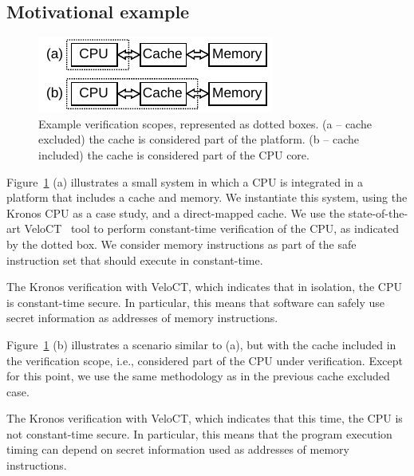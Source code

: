 \subsection{Motivational example}

\begin{figure}[t]
    \begin{center}
    \includegraphics[width=0.6\columnwidth]{figures/verifscopecache/verifscopecache.pdf}
    \end{center}
    \vspace*{-1em}
    \caption{\label{fig:verifscopecache}
        Example verification scopes, represented as dotted boxes. (a -- cache excluded) the cache is considered part of the platform. (b -- cache included) the cache is considered part of the CPU core.
    }
    \vspace*{-1em}
\end{figure}


Figure~\ref{fig:verifscopecache} (a) illustrates a small system in which a CPU is integrated in a platform that includes a cache and memory.
We instantiate this system, using the Kronos CPU as a case study, and a direct-mapped cache.
We use the state-of-the-art VeloCT~\cite{dinesh2025h} tool to perform constant-time verification of the CPU, as indicated by the dotted box.
We consider memory instructions as part of the safe instruction set that should execute in constant-time.

The Kronos verification with VeloCT, which indicates that in isolation, the CPU is constant-time secure.
In particular, this means that software can safely use secret information as addresses of memory instructions.

Figure~\ref{fig:verifscopecache} (b) illustrates a scenario similar to (a), but with the cache included in the verification scope, i.e., considered part of the CPU under verification.
Except for this point, we use the same methodology as in the previous cache excluded case.

The Kronos verification with VeloCT, which indicates that this time, the CPU is not constant-time secure.
In particular, this means that the program execution timing can depend on secret information used as addresses of memory instructions.

